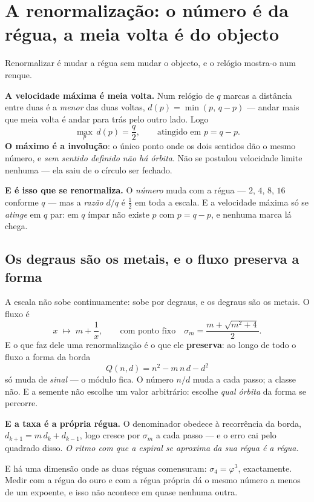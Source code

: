 \documentclass[11pt,a4paper]{article}
\begin{document}
\section{A renormalização: o número é da régua, a meia volta é do objecto}\label{sec:renorm}

Renormalizar é mudar a régua sem mudar o objecto, e o relógio mostra-o num renque.

\smallskip
\noindent \textbf{A velocidade máxima é meia volta.} Num relógio de $q$ marcas a distância entre
duas é a \emph{menor} das duas voltas, $d(p)=\min(p,\,q-p)$ --- andar mais que meia volta é andar
para trás pelo outro lado. Logo
\[
  \max_p\,d(p)=\frac{q}{2},\qquad\text{atingido em } p=q-p .
\]
\textbf{O máximo é a involução}: o único ponto onde os dois sentidos dão o mesmo número, e \emph{sem
sentido definido não há órbita}. Não se postulou velocidade limite nenhuma --- ela saiu de o círculo
ser fechado.

\smallskip
\noindent \textbf{E é isso que se renormaliza.} O \emph{número} muda com a régua --- $2$, $4$, $8$,
$16$ conforme $q$ --- mas a \emph{razão} $d/q$ é $\tfrac12$ em toda a escala. E a velocidade máxima
só se \emph{atinge} em $q$ par: em $q$ ímpar não existe $p$ com $p=q-p$, e nenhuma marca lá chega.

\subsection*{Os degraus são os metais, e o fluxo preserva a forma}

A escala não sobe continuamente: sobe por degraus, e os degraus são os metais. O fluxo é
\[
  x\;\longmapsto\;m+\frac1x,\qquad\text{com ponto fixo}\quad \sigma_m=\frac{m+\sqrt{m^2+4}}{2}.
\]
E o que faz dele uma renormalização é o que ele \textbf{preserva}: ao longo de todo o fluxo a forma
da borda
\[
  Q(n,d)=n^2-m\,n\,d-d^2
\]
só muda de \emph{sinal} --- o módulo fica. O número $n/d$ muda a cada passo; a classe não. E a
semente não escolhe um valor arbitrário: escolhe \emph{qual órbita} da forma se percorre.

\smallskip
\noindent \textbf{E a taxa é a própria régua.} O denominador obedece à recorrência da borda,
$d_{k+1}=m\,d_k+d_{k-1}$, logo cresce por $\sigma_m$ a cada passo --- e o erro cai pelo quadrado
disso. \emph{O ritmo com que a espiral se aproxima da sua régua é a régua.}

\smallskip
\noindent E há uma dimensão onde as duas réguas comensuram: $\sigma_4=\varphi^3$, exactamente. Medir
com a régua do ouro e com a régua própria dá o mesmo número a menos de um expoente, e isso não
acontece em quase nenhuma outra.
\end{document}
